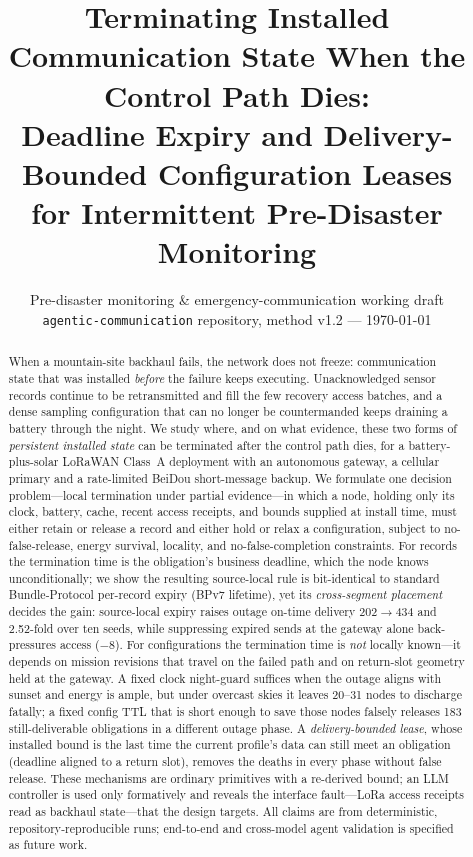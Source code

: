 \documentclass[11pt]{article}
\title{\textbf{Terminating Installed Communication State When the Control Path Dies:\\
Deadline Expiry and Delivery-Bounded Configuration Leases\\
for Intermittent Pre-Disaster Monitoring}}
\author{Pre-disaster monitoring \& emergency-communication working draft\\
\texttt{agentic-communication} repository, method v1.2 --- \today}
\date{}
\begin{document}
\maketitle

\begin{abstract}
When a mountain-site backhaul fails, the network does not freeze: communication state that was
installed \emph{before} the failure keeps executing. Unacknowledged sensor records continue to be
retransmitted and fill the few recovery access batches, and a dense sampling configuration that can
no longer be countermanded keeps draining a battery through the night. We study where, and on what
evidence, these two forms of \emph{persistent installed state} can be terminated after the control
path dies, for a battery-plus-solar LoRaWAN Class~A deployment with an autonomous gateway, a
cellular primary and a rate-limited BeiDou short-message backup. We formulate one decision
problem---local termination under partial evidence---in which a node, holding only its clock,
battery, cache, recent access receipts, and bounds supplied at install time, must either retain or
release a record and either hold or relax a configuration, subject to no-false-release, energy
survival, locality, and no-false-completion constraints. For records the termination time is the
obligation's business deadline, which the node knows unconditionally; we show the resulting
source-local rule is bit-identical to standard Bundle-Protocol per-record expiry (BPv7 lifetime),
yet its \emph{cross-segment placement} decides the gain: source-local expiry raises outage on-time
delivery 202$\to$434 and 2.52-fold over ten seeds, while suppressing expired sends at the gateway
alone back-pressures access ($-8$). For configurations the termination time is \emph{not} locally
known---it depends on mission revisions that travel on the failed path and on return-slot geometry
held at the gateway. A fixed clock night-guard suffices when the outage aligns with sunset and
energy is ample, but under overcast skies it leaves 20--31 nodes to discharge fatally; a fixed
config TTL that is short enough to save those nodes falsely releases 183 still-deliverable
obligations in a different outage phase. A \emph{delivery-bounded lease}, whose installed bound is
the last time the current profile's data can still meet an obligation (deadline aligned to a return
slot), removes the deaths in every phase without false release. These mechanisms are ordinary
primitives with a re-derived bound; an LLM controller is used only formatively and reveals the
interface fault---LoRa access receipts read as backhaul state---that the design targets. All
claims are from deterministic, repository-reproducible runs; end-to-end and cross-model agent
validation is specified as future work.
\end{abstract}
\end{document}

